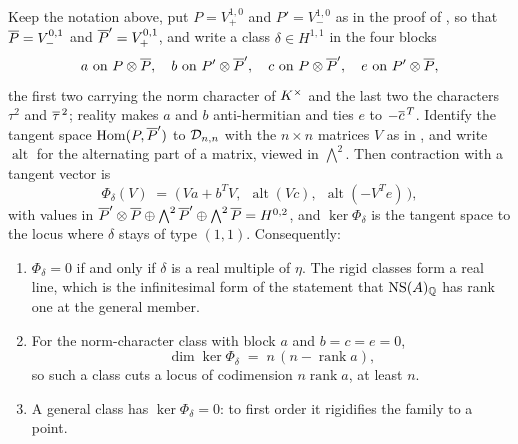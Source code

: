 \begin{proposition}%
\label{prop:rigidity}
Keep the notation above, put $P=V_{+}^{1,0}$ and $P'=V_{-}^{1,0}$ as in the
proof of , so that $\overline{P}=V_{-}^{0,1}$ and
$\overline{P}'=V_{+}^{0,1}$, and write a class $\delta\in H^{1,1}$ in the four
blocks
\[
  a\ \text{on}\ P\otimes\bbar{P},\quad
  b\ \text{on}\ P'\otimes\bbar{P}',\quad
  c\ \text{on}\ P\otimes\bbar{P}',\quad
  e\ \text{on}\ P'\otimes\bbar{P},
\]
the first two carrying the norm character of $K^{\times}$ and the last two the
characters $\tau^{2}$ and $\overline{\tau}^{\,2}$; reality makes $a$ and $b$
anti-hermitian and ties $e$ to $-\overline{c}^{\,T}$. Identify the tangent space
$\operatorname{Hom}(P,\overline{P}')$ to $\mathcal{D}_{n,n}$ with the $n\times n$ matrices $V$ as in
, and write $\operatorname{alt}$ for the alternating part
of a matrix, viewed in $\bigwedge^{2}$. Then contraction with a tangent
vector is
\begin{equation}\label{eq:phidelta}
  \Phi_{\delta}(V)
  \;=\;\bigl(\,Va+b^{T}V,\ \ \operatorname{alt}(Vc),\ \
       \operatorname{alt}(-V^{T}e)\,\bigr),
\end{equation}
with values in
$\overline{P}'\otimes\overline{P}\oplus\bigwedge^{2}\overline{P}'\oplus\bigwedge^{2}\overline{P}
=H^{0,2}$, and $\ker\Phi_{\delta}$ is the tangent space to the locus where
$\delta$ stays of type $(1,1)$. Consequently:
\begin{enumerate}[label=\textup{(\roman*)},nosep]
\item $\Phi_{\delta}=0$ if and only if $\delta$ is a real multiple of $\eta$.
  The rigid classes form a real line, which is the infinitesimal form of the
  statement that $\mathrm{NS}(A)_{\mathbb{Q}}$ has rank one at the general member.
\item For the norm-character class with block $a$ and $b=c=e=0$,
  \[
    \dim\ker\Phi_{\delta}\;=\;n\,(n-\operatorname{rank}a),
  \]
  so such a class cuts a locus of codimension $n\operatorname{rank}a$, at
  least $n$.
\item A general class has $\ker\Phi_{\delta}=0$: to first order it
  rigidifies the family to a point.
\end{enumerate}
\end{proposition}

